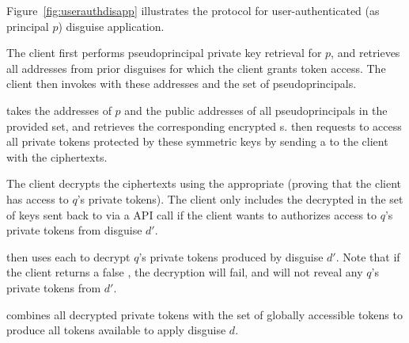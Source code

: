 Figure~\ref{fig:userauthdisapp} illustrates the protocol for user-authenticated (as principal $p$) disguise application.

The client first performs pseudoprincipal private key retrieval for $p$, and retrieves all addresses from
prior disguises for which the client grants token access.
%
The client then invokes  with these addresses and the set of pseudoprincipals.

\sys takes the addresses of $p$ and the public addresses of all pseudoprincipals in the
provided set, and retrieves the corresponding encrypted \symk{}s.
\sys then requests to access all private tokens protected by these symmetric keys by sending a
 to the client with the \symk{} ciphertexts.

The client decrypts the ciphertexts using the appropriate  (proving
that the client has access to $q$'s private tokens). 
%
The client only includes the decrypted  in the set of keys sent back to \sys via a
 API call if the client wants to authorizes access to $q$'s private tokens
from disguise $d'$. 

\sys then uses each  to decrypt $q$'s private tokens produced by disguise $d'$. Note that
if the client returns a false , the decryption will fail, and \sys will not reveal any
$q$'s private tokens from $d'$.

\sys combines all decrypted private tokens with the set of globally accessible tokens to produce
all tokens available to apply disguise $d$. 


